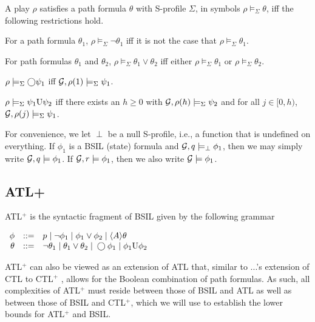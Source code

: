 A play $\rho$ satisfies a path formula $\theta$ with S-profile $\Sigma$, 
in symbols $\rho\models_\Sigma\theta$, 
iff the following restrictions hold.
\begin{list1} 
\item For a path formula $\theta_1$, 
    $\rho\models_\Sigma\neg\theta_1$ iff
    it is not the case that $\rho\models_\Sigma\theta_1$.
\item For path formulas $\theta_1$ and $\theta_2$, 
    $\rho\models_\Sigma\theta_1\vee\theta_2$ iff
    either $\rho\models_\Sigma\theta_1$
    or $\rho\models_\Sigma\theta_2$.
\item $\rho\models_\Sigma\bigcirc\psi_1$
    iff ${\cal G},\rho(1)\models_\Sigma\psi_1$.
\item $\rho\models_\Sigma\psi_1\textrm{U}\psi_2$
    iff there exists an $h\geq 0$ with ${\cal G},\rho(h)\models_\Sigma\psi_2$ 
    and for all $j\in [0,h)$, ${\cal G},\rho(j)\models_\Sigma\psi_1$.
\end{list1}
For convenience, we let $\perp$ be a null S-profile, 
i.e., a function that is undefined on everything. 
If $\phi_1$ is a BSIL (state) formula and ${\cal G},q\models_\perp\phi_1$,
then we may simply write ${\cal G},q\models\phi_1$.  
If ${\cal G},r\models\phi_1$, then we also write ${\cal G}\models\phi_1$.
\subsection{ATL+}
ATL$^+$ is the syntactic fragment of BSIL given by the following grammar

\begin{center}
$\begin{array}{rcl}
\phi    & ::= & p\;|\; \neg \phi_1 \;|\; \phi_1\vee \phi_2 
    \;|\; \langle  A\rangle \theta
    \\
\theta  & ::= & \neg\theta_1 \;|\; \theta_1\vee \theta_2 
    \;|\; \bigcirc \phi_1
    \;|\; \phi_1\textrm{U} \phi_2
\end{array}$
\end{center}

ATL$^+$ can also be viewed as an extension of ATL \cite{AHK02} that, similar to ...'s extension of CTL to CTL$^+$ \cite{BPM83,EH86}, allows for the Boolean combination of path formulas.
As such, all complexities of ATL$^+$ must reside between those of BSIL and ATL as well as between those of BSIL and CTL$^+$, which we will use to establish the lower bounds for ATL$^+$ and BSIL.

